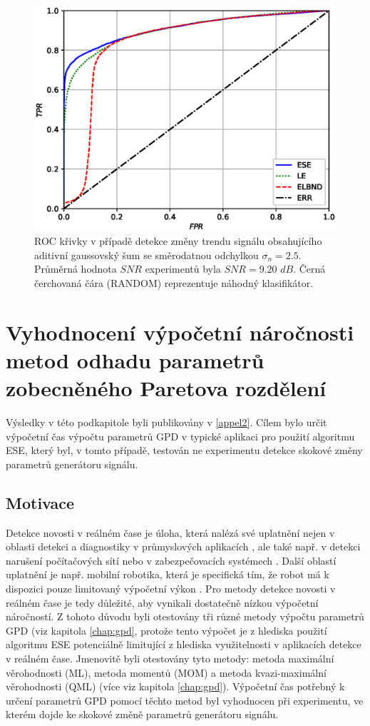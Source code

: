 \begin{figure}[ht!]
    \centering
    \includegraphics[scale=0.73]{IMG/appel_roc/roc_25.eps}
    \caption{ROC křivky v případě detekce změny trendu signálu obsahujícího aditivní gaussovský šum se směrodatnou odchylkou $\sigma_n=2.5$. Průměrná hodnota $SNR$ experimentů byla $SNR=9.20$ $dB$. Černá čerchovaná čára (RANDOM) reprezentuje náhodný klasifikátor.}
    \label{fig:roc_25}
\end{figure}

\section{Vyhodnocení výpočetní náročnosti metod odhadu parametrů zobecněného Paretova rozdělení}\label{chap:appel_gpd}
Výsledky v této podkapitole byli publikovány v \ref{appel2}. Cílem bylo určit výpočetní čas výpočtu parametrů GPD v typické aplikaci pro použití algoritmu ESE, který byl, v tomto případě, testován ne experimentu detekce skokové změny parametrů generátoru signálu.
\subsection{Motivace}
Detekce novosti v reálném čase je úloha, která nalézá své uplatnění nejen v oblasti detekci a diagnostiky v průmyslových aplikacích \cite{fault}, ale také např. v detekci narušení počítačových sítí \cite{data_streams} nebo v zabezpečovacích systémech \cite{surveilance}. Další oblastí uplatnění je např. mobilní robotika, která je specifická tím, že robot má k dispozici pouze limitovaný výpočetní výkon \cite{robotics_marslan,robotics}. Pro metody detekce novosti v reálném čase je tedy důležité, aby vynikali dostatečně nízkou výpočetní náročností. Z tohoto důvodu byli otestovány tři různé metody výpočtu parametrů GPD (viz kapitola \ref{chap:gpd}, protože tento výpočet je z hlediska použití algoritmu ESE potenciálně limitující z hlediska využitelnosti v aplikacích detekce v reálném čase. Jmenovitě byli otestovány tyto metody: metoda maximální věrohodnosti (ML), metoda momentů (MOM) a metoda kvazi-maximální věrohodnosti (QML) (více viz kapitola \ref{chap:gpd}). Výpočetní čas potřebný k určení parametrů GPD pomocí těchto metod byl vyhodnocen při experimentu, ve kterém dojde ke skokové změně parametrů generátoru signálu.
